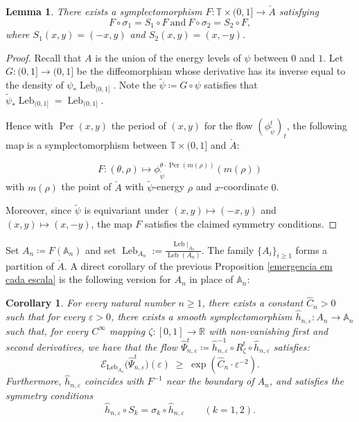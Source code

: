 \documentclass[11pt,reqno]{amsart}
\theoremstyle{plain}
\newtheorem{lemma}[theorem]{Lemma}
\newtheorem{coro}[theorem]{Corollary}
\theoremstyle{definition}
\theoremstyle{remark}
\theoremstyle{plain}
\numberwithin{equation}{section}
\newcommand{\R}{\mathbb{R}}
\newcommand{\T}{\mathbb{T}}
\newcommand{\A}{\mathbb{A}}
\newcommand{\Leb}{\operatorname{Leb}}
\newcommand{\Per}{\operatorname{Per}}
\newcommand{\eps}{\varepsilon}
\begin{document}
\begin{lemma} \label{lemma: construcao da F}
	There exists a symplectomorphism $F: \T\times (0,1]\to \check{A}$ satisfying 
	\[
	F\circ \sigma_1 =S_1 \circ F \ \text{and} \ F\circ \sigma_2=S_2 \circ F,
	\]
	where $S_{1}(x,y)=(-x,y)$ and $S_{2}(x,y)=(x,-y)$.
\end{lemma}	
\begin{proof} 
    Recall that $A$ is the union of the energy levels of $\psi$ between $0$ and $1$. 
	Let $G: (0,1]\to (0,1]$ be the diffeomorphism whose derivative has its inverse equal to the density of $\psi_\ast \Leb_{(0,1]}$. Note the $\tilde \psi\coloneqq G\circ \psi$ satisfies that $\tilde \psi_{\ast}\Leb_{(0,1]}=\Leb_{(0,1]}$.
	  
	Hence with $\Per(x,y)$ the period of $(x,y)$ for the flow $(\phi^{t}_{\tilde \psi})_{t}$, the following map is a symplectomorphism between $\T\times (0,1]$ and $\check{A}$: 
	
	\[
     F: (\theta,\rho)\mapsto \phi_{\tilde \psi}^{\theta\cdot \Per(m(\rho))}(m(\rho)) 
	\]
	with $m(\rho)$ the point of $\check A$ with $\tilde \psi$-energy $\rho$ and $x$-coordinate $0$.
	
	Moreover, since $\tilde \psi$ is equivariant under $(x,y)\mapsto (-x,y)$ and $(x,y)\mapsto (x,-y)$, the map $F$ satisfies the claimed symmetry conditions. 
\end{proof}	


Set $A_{n}\coloneqq F(\mathbb{A}_{n})$ and set \( \Leb_{A_n}:=\frac{\Leb|_{A_n}}{\Leb(A_n)}\). The family $\{A_{i}\}_{i\geq 1}$ forms a partition of $\check{A}$. A direct corollary of the previous Proposition \ref{emergencia em cada escala} is the following version for $A_n$ in place of $\mathbb{A}_n$:



\begin{coro}\label{corolario da modificacao da prop 7}
For every natural number $n\geq 1$, there exists a constant $\widehat{C}_{n}>0$ such that for every $\eps>0$, there exists a smooth symplectomorphism $\widehat{h}_{n,\eps}\colon A_{n}\to \A_{n}$ such that, for every $C^{\infty}$ mapping $ \zeta\colon [0,1]\to \R$ with non-vanishing first and second derivatives, we have that the flow $\widehat{\Psi}^{t}_{n,\eps}\coloneqq \widehat{h}^{-1}_{n,\eps}\circ 
R^{t}_{ \zeta}\circ  \widehat{h}_{n,\eps}$ satisfies: 
\[
\mathcal{E}_{\mathrm{Leb}_{A_n}}\big(\widehat\Psi^t_{n,\eps}\big)(\eps)
\;\ge\; \exp\!\left(\widehat C_n\cdot\eps^{-2}\right).
\]
Furthermore, $\widehat{h}_{n,\eps}$ coincides with $F^{-1}$ near the boundary of $A_{n}$, and satisfies the symmetry conditions 
\[
\widehat{h}_{n,\eps}\circ S_{k}=\sigma_{k}\circ \widehat{h}_{n,\eps}\qquad (k=1,2).
\]
\end{coro}
\end{document}
